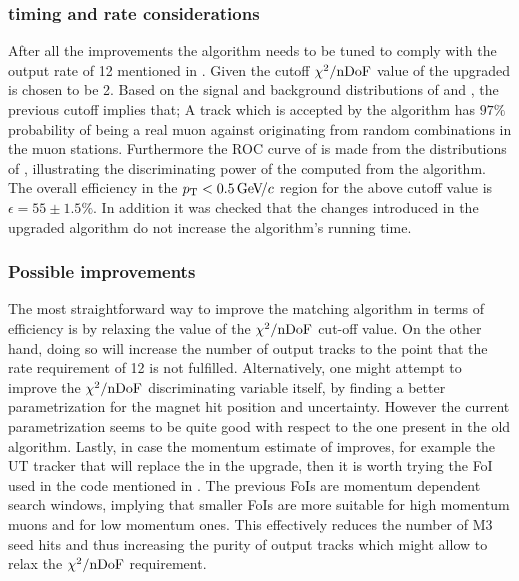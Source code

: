\subsubsection{\hltone timing and rate considerations}
After all the improvements the \mvTTm algorithm needs to be tuned to comply with the \hltone output rate of 12
\khz mentioned in . Given the cutoff $\chi^2/\rm nDoF$ value of the upgraded \mvTTm is chosen to be 2.
Based on the signal and background distributions of  and , the previous cutoff implies that;
A \velo track which is accepted by the \mvTTm algorithm has $97\%$ probability of being a real muon against originating from
random combinations in the muon stations.
Furthermore the ROC curve of  is made from the \cdf distributions of , illustrating
the discriminating power of the \chisq computed from the \mvTTm algorithm.
The overall \mvTTm efficiency in the $\mbox{$p_{\rm T}$}<0.5{\mathrm{\,Ge\kern -0.1em V\!/}c}$ region for the above cutoff value is $\epsilon = 55 \pm 1.5 \%$.
In addition it was checked that the changes introduced in the upgraded \mvTTm algorithm
do not increase the algorithm's running time.

\subsubsection{Possible improvements}
The most straightforward way to improve the matching algorithm in terms of efficiency is
by relaxing the value of the $\chi^2/\rm nDoF$ cut-off value. On the other hand, doing so will increase the number
of output tracks to the point that the \hltone rate requirement of 12 \khz is not fulfilled.
Alternatively, one might attempt to improve the $\chi^2/\rm nDoF$ discriminating variable itself,
by finding a better parametrization for the magnet hit position and uncertainty. However the current
parametrization seems to be quite good with respect to the one present in the old \mvm algorithm.
Lastly, in case the momentum estimate of \ttracker improves, for example the UT tracker
that will replace the \ttracker in the \lhcb upgrade, then it is worth trying the FoI used in the \muonID code
mentioned in . The previous FoIs are momentum dependent search windows, implying
that smaller FoIs are more suitable for high momentum muons and \viceversa for low momentum ones.
This effectively reduces the number of M3 seed hits and thus increasing the purity of output tracks
which might allow to relax the $\chi^2/\rm nDoF$ requirement.
